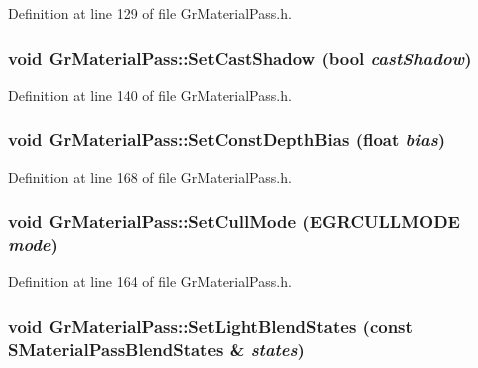 Definition at line 129 of file GrMaterialPass.h.\hypertarget{class_gr_material_pass_148e7583791d48dfad8a19bcbadcd8c2}{
\subsubsection[{SetCastShadow}]{\setlength{\rightskip}{0pt plus 5cm}void GrMaterialPass::SetCastShadow (bool {\em castShadow})}}
\label{class_gr_material_pass_148e7583791d48dfad8a19bcbadcd8c2}




Definition at line 140 of file GrMaterialPass.h.\hypertarget{class_gr_material_pass_9803fdd3bec657d410491f8b43a3a21e}{
\subsubsection[{SetConstDepthBias}]{\setlength{\rightskip}{0pt plus 5cm}void GrMaterialPass::SetConstDepthBias (float {\em bias})}}
\label{class_gr_material_pass_9803fdd3bec657d410491f8b43a3a21e}




Definition at line 168 of file GrMaterialPass.h.\hypertarget{class_gr_material_pass_8c69d8f73a4a4742661c28d33c62d5c5}{
\subsubsection[{SetCullMode}]{\setlength{\rightskip}{0pt plus 5cm}void GrMaterialPass::SetCullMode ({\bf EGRCULLMODE} {\em mode})}}
\label{class_gr_material_pass_8c69d8f73a4a4742661c28d33c62d5c5}




Definition at line 164 of file GrMaterialPass.h.\hypertarget{class_gr_material_pass_f2cca95d15241405447e463f271c5e50}{
\subsubsection[{SetLightBlendStates}]{\setlength{\rightskip}{0pt plus 5cm}void GrMaterialPass::SetLightBlendStates (const {\bf SMaterialPassBlendStates} \& {\em states})}}
\label{class_gr_material_pass_f2cca95d15241405447e463f271c5e50}




